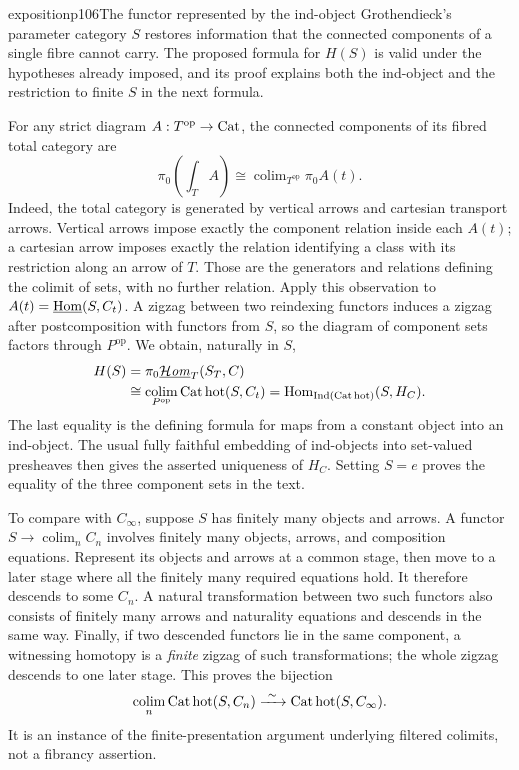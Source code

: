 \begin{dcomment}{exposition}{p106}{The functor represented by the ind-object}
Grothendieck's parameter category $S$ restores information that the connected components of a single fibre cannot carry. The proposed formula for $H(S)$ is valid under the hypotheses already imposed, and its proof explains both the ind-object and the restriction to finite $S$ in the next formula.

For any strict diagram $A:T^{\mathrm{op}}\to\mathrm{Cat}$, the connected components of its fibred total category are
\[
 \pi_0\left(\int_T A\right)
 \cong\mathop{\mathrm{colim}}_{T^{\mathrm{op}}}\pi_0 A(t).
\]
Indeed, the total category is generated by vertical arrows and cartesian transport arrows. Vertical arrows impose exactly the component relation inside each $A(t)$; a cartesian arrow imposes exactly the relation identifying a class with its restriction along an arrow of $T$. Those are the generators and relations defining the colimit of sets, with no further relation. Apply this observation to $A(t)=\underline{\mathrm{Hom}}(S,C_t)$. A zigzag between two reindexing functors induces a zigzag after postcomposition with functors from $S$, so the diagram of component sets factors through $P^{\mathrm{op}}$. We obtain, naturally in $S$,
\[
 \begin{split}
 H(S)&=\pi_0\underline{\mathcal{H}\mathit{om}}_T(S_T,C)\\
 &\cong\mathop{\mathrm{colim}}_{P^{\mathrm{op}}}
       \mathrm{Cat\,hot}(S,C_t)
 =\mathrm{Hom}_{\operatorname{Ind}(\mathrm{Cat\,hot})}(S,H_C).
 \end{split}
\]
The last equality is the defining formula for maps from a constant object into an ind-object. The usual fully faithful embedding of ind-objects into set-valued presheaves then gives the asserted uniqueness of $H_C$. Setting $S=e$ proves the equality of the three component sets in the text.

To compare with $C_\infty$, suppose $S$ has finitely many objects and arrows. A functor $S\to\mathop{\mathrm{colim}}_n C_n$ involves finitely many objects, arrows, and composition equations. Represent its objects and arrows at a common stage, then move to a later stage where all the finitely many required equations hold. It therefore descends to some $C_n$. A natural transformation between two such functors also consists of finitely many arrows and naturality equations and descends in the same way. Finally, if two descended functors lie in the same component, a witnessing homotopy is a \emph{finite} zigzag of such transformations; the whole zigzag descends to one later stage. This proves the bijection
\[
 \mathop{\mathrm{colim}}_n\mathrm{Cat\,hot}(S,C_n)
 \xrightarrow{\ \sim\ }\mathrm{Cat\,hot}(S,C_\infty).
\]
It is an instance of the finite-presentation argument underlying filtered colimits, not a fibrancy assertion.


\end{dcomment}
